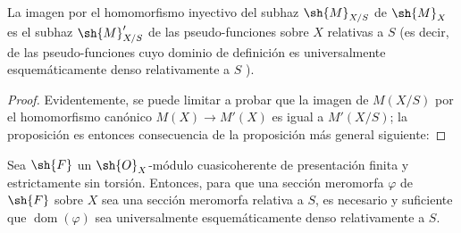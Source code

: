 \begin{proposition}[20.6.3]
\label{IV.20.6.3}
La imagen por el homomorfismo inyectivo  del subhaz $\sh{M}_{X/S}$ de $\sh{M}_X$ es el subhaz $\sh{M}'_{X/S}$ de las pseudo-funciones sobre $X$ relativas a $S$ \textup{(es decir,} de las pseudo-funciones cuyo dominio de definición es universalmente esquemáticamente denso relativamente a $S$ \textup{)}.
\end{proposition}

\begin{proof}
Evidentemente, se puede limitar a probar que la imagen de $M(X/S)$ por el homomorfismo canónico $M(X)\to M'(X)$ es igual a $M'(X/S)$; la proposición es entonces consecuencia de la proposición más general siguiente:
\end{proof}

\begin{proposition}[20.6.4]
\label{IV.20.6.4}
Sea $\sh{F}$ un $\sh{O}_X$-módulo cuasicoherente de presentación finita y estrictamente sin torsión.
Entonces, para que una sección meromorfa $\varphi$ de $\sh{F}$ sobre $X$ sea una sección meromorfa relativa a $S$, es necesario y suficiente que $\operatorname{dom}(\varphi)$ sea universalmente esquemáticamente denso relativamente a $S$.
\end{proposition}

